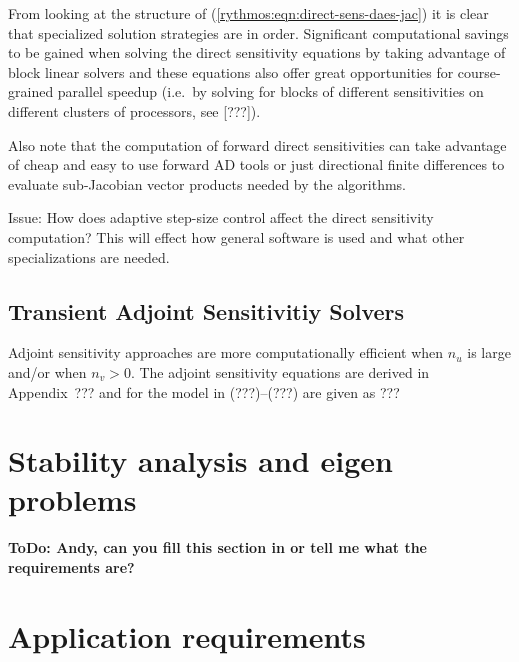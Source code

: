 \documentclass[pdf,ps2pdf,11pt]{SANDreport}
\begin{document}
From looking at the structure of (\ref{rythmos:eqn:direct-sens-daes-jac}) it
is clear that specialized solution strategies are in order.  Significant
computational savings to be gained when solving the direct sensitivity
equations by taking advantage of block linear solvers and these equations also
offer great opportunities for course-grained parallel speedup (i.e.\ by
solving for blocks of different sensitivities on different clusters of
processors, see [???]).

Also note that the computation of forward direct sensitivities can take
advantage of cheap and easy to use forward AD tools or just directional finite
differences to evaluate sub-Jacobian vector products needed by the algorithms.

Issue: How does adaptive step-size control affect the direct sensitivity
computation?  This will effect how general software is used and what other
specializations are needed.

\subsection{Transient Adjoint Sensitivitiy Solvers}

Adjoint sensitivity approaches are more computationally efficient when $n_u$
is large and/or when $n_v > 0$.  The adjoint sensitivity equations are derived in
Appendix~??? and for the model in (???)--(???) are given as
%
???
%

\section{Stability analysis and eigen problems}

{}\textbf{ToDo: Andy, can you fill this section in or tell me what the
requirements are?}

\section{Application requirements}
\end{document}
